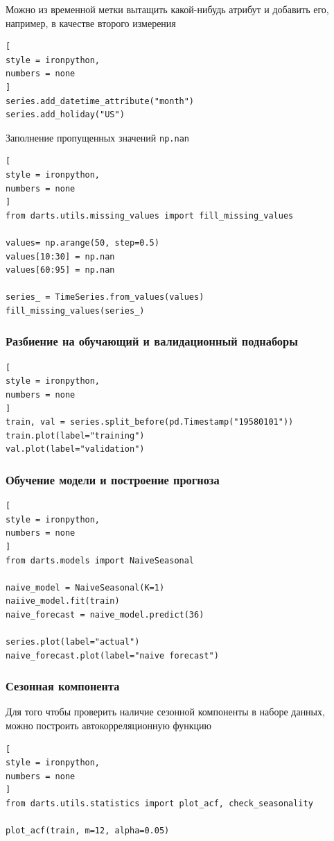 \documentclass[%
	11pt,
	a4paper,
	utf8,
		]{article}
\begin{document}
Можно из временной метки вытащить какой-нибудь атрибут и добавить его, например, в качестве второго измерения
\begin{lstlisting}[
style = ironpython,
numbers = none
]
series.add_datetime_attribute("month")
series.add_holiday("US")
\end{lstlisting}

Заполнение пропущенных значений \verb|np.nan|
\begin{lstlisting}[
style = ironpython,
numbers = none
]
from darts.utils.missing_values import fill_missing_values

values= np.arange(50, step=0.5)
values[10:30] = np.nan
values[60:95] = np.nan

series_ = TimeSeries.from_values(values)
fill_missing_values(series_)
\end{lstlisting}

\subsubsection{Разбиение на обучающий и валидационный поднаборы}

\begin{lstlisting}[
style = ironpython,
numbers = none
]
train, val = series.split_before(pd.Timestamp("19580101"))
train.plot(label="training")
val.plot(label="validation")
\end{lstlisting}

\subsubsection{Обучение модели и построение прогноза}

\begin{lstlisting}[
style = ironpython,
numbers = none
]
from darts.models import NaiveSeasonal

naive_model = NaiveSeasonal(K=1)
naiive_model.fit(train)
naive_forecast = naive_model.predict(36)

series.plot(label="actual")
naive_forecast.plot(label="naive forecast")
\end{lstlisting}

\subsubsection{Сезонная компонента}

Для того чтобы проверить наличие сезонной компоненты в наборе данных, можно построить автокорреляционную функцию
\begin{lstlisting}[
style = ironpython,
numbers = none
]
from darts.utils.statistics import plot_acf, check_seasonality

plot_acf(train, m=12, alpha=0.05)
\end{lstlisting}
\end{document}
